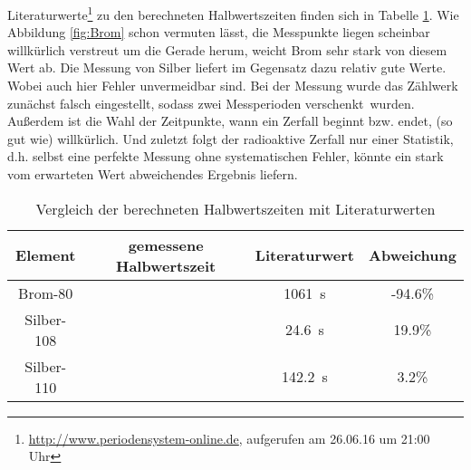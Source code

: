 Literaturwerte\footnote{\url{http://www.periodensystem-online.de}, aufgerufen am 26.06.16 um 21:00 Uhr} zu den berechneten Halbwertszeiten finden sich in Tabelle \ref{tab:Lit}. Wie Abbildung \ref{fig:Brom} schon vermuten lässt, die Messpunkte liegen scheinbar willkürlich verstreut um die Gerade herum, weicht Brom sehr stark von diesem Wert ab. Die Messung von Silber liefert im Gegensatz dazu relativ gute Werte. Wobei auch hier Fehler unvermeidbar sind. Bei der Messung wurde das Zählwerk zunächst falsch eingestellt, sodass zwei Messperioden \glqq verschenkt\grqq\ wurden. Außerdem ist die Wahl der Zeitpunkte, wann ein Zerfall beginnt bzw. endet, (so gut wie) willkürlich. Und zuletzt folgt der radioaktive Zerfall nur einer Statistik, d.h. selbst eine perfekte Messung ohne systematischen Fehler, könnte ein stark vom erwarteten Wert abweichendes Ergebnis liefern.
\begin{table}[h!]
\centering
\caption{Vergleich der berechneten Halbwertszeiten mit Literaturwerten}
\label{tab:Lit}
\begin{tabular}{cccc}
	\toprule
	Element & gemessene Halbwertszeit & Literaturwert & Abweichung \\
	\midrule
	Brom-80 &  & \SI{1061}{\second} & -94.6\% \\
	Silber-108 &  & \SI{24.6}{\second} & 19.9\% \\
	Silber-110 &  & \SI{142.2}{\second} & 3.2\% \\
	\bottomrule
\end{tabular}
\end{table}
